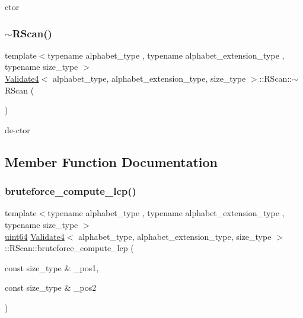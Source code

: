 ctor 

\mbox{\label{struct_validate4_1_1_r_scan_a853d1a1bbc53a8b1cacf231c0f64bf8a}} 
\subsubsection{\texorpdfstring{$\sim$\+R\+Scan()}{~RScan()}}
{\footnotesize\ttfamily template$<$typename alphabet\+\_\+type , typename alphabet\+\_\+extension\+\_\+type , typename size\+\_\+type $>$ \\
\hyperlink{class_validate4}{Validate4}$<$ alphabet\+\_\+type, alphabet\+\_\+extension\+\_\+type, size\+\_\+type $>$\+::R\+Scan\+::$\sim$\+R\+Scan (\begin{DoxyParamCaption}{ }\end{DoxyParamCaption})\hspace{0.3cm}{\ttfamily [inline]}}



de-\/ctor 



\subsection{Member Function Documentation}
\mbox{\label{struct_validate4_1_1_r_scan_adc3cb04c1da68e1ac8a544c1eaf7c00c}} 
\subsubsection{\texorpdfstring{bruteforce\+\_\+compute\+\_\+lcp()}{bruteforce\_compute\_lcp()}}
{\footnotesize\ttfamily template$<$typename alphabet\+\_\+type , typename alphabet\+\_\+extension\+\_\+type , typename size\+\_\+type $>$ \\
\hyperlink{types_8h_a60e8696a4678cd348e991a1f172e53f7}{uint64} \hyperlink{class_validate4}{Validate4}$<$ alphabet\+\_\+type, alphabet\+\_\+extension\+\_\+type, size\+\_\+type $>$\+::R\+Scan\+::bruteforce\+\_\+compute\+\_\+lcp (\begin{DoxyParamCaption}\item[{const size\+\_\+type \&}]{\+\_\+pos1,  }\item[{const size\+\_\+type \&}]{\+\_\+pos2 }\end{DoxyParamCaption})\hspace{0.3cm}{\ttfamily [inline]}}



